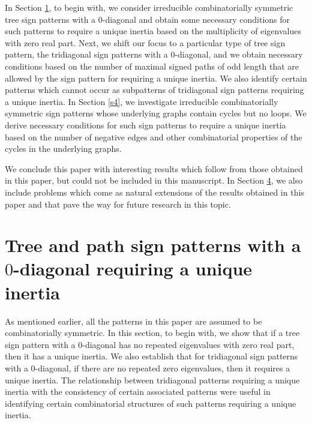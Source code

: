 \documentclass[10pt,a4paper]{amsart}
\numberwithin{equation}{section}
\begin{document}
	
	
	
	
	In Section \ref{s2}, to begin with, we consider irreducible combinatorially symmetric tree sign patterns with a $0$-diagonal and obtain some necessary conditions for such patterns to require a unique inertia based on the multiplicity of eigenvalues with zero real part. Next, we shift our focus to a particular type of tree sign pattern, the tridiagonal sign patterns with a $0$-diagonal, and we obtain necessary conditions based on the number of maximal signed paths of odd length that are allowed by the sign pattern for requiring a unique inertia. We also identify certain patterns which cannot occur as subpatterns of tridiagonal sign patterns requiring a unique inertia. 
	In Section \ref{s4}, we investigate irreducible combinatorially symmetric sign patterns whose underlying graphs contain cycles but no loops. We derive necessary conditions for such sign patterns to require a unique inertia based on the number of negative edges and other combinatorial properties of the cycles in the underlying graphs.
	
	We conclude this paper with interesting results which follow from those obtained in this paper, but could not be included in this manuscript. In Section \href{https://arxiv.org/abs/2508.21509v1}{4}, we also include problems which come as natural extensions of the results obtained in this paper and that pave the way for future research in this topic. 
	
	
	
	\section{Tree and path sign patterns with a $0$-diagonal requiring a unique inertia} \label{s2}
	
	As mentioned earlier, all the patterns in this paper are assumed to be combinatorially symmetric.
	In this section, to begin with, we show that if a tree sign pattern with a $0$-diagonal has no repeated eigenvalues with zero real part, then it has a unique inertia. 
	We also establish that for tridiagonal sign patterns with a $0$-diagonal, if there are no repeated zero eigenvalues, then it requires a unique inertia.
	The relationship between tridiagonal patterns requiring a unique inertia with the consistency of certain associated patterns were useful in identifying certain combinatorial structures of such patterns requiring a unique inertia.
	
	
	
\end{document}
